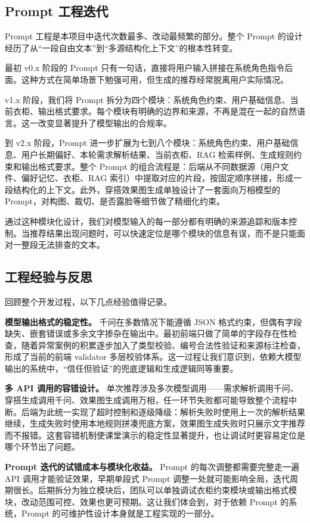 \documentclass{applemlr}
\begin{document}
\subsection{Prompt 工程迭代}

Prompt 工程是本项目中迭代次数最多、改动最频繁的部分。整个 Prompt 的设计经历了从``一段自由文本''到``多源结构化上下文''的根本性转变。

最初 v0.x 阶段的 Prompt 只有一句话，直接将用户输入拼接在系统角色指令后面。这种方式在简单场景下勉强可用，但生成的推荐经常脱离用户实际情况。

v1.x 阶段，我们将 Prompt 拆分为四个模块：系统角色约束、用户基础信息、当前衣柜、输出格式要求。每个模块有明确的边界和来源，不再是混在一起的自然语言。这一改变显著提升了模型输出的合规率。

到 v2.x 阶段，Prompt 进一步扩展为七到八个模块：系统角色约束、用户基础信息、用户长期偏好、本轮需求解析结果、当前衣柜、RAG 检索样例、生成规则约束和输出格式要求。整个 Prompt 的组合流程是：后端从不同数据源（用户文件、偏好记忆、衣柜、RAG 索引）中提取对应的片段，按固定顺序拼接，形成一段结构化的上下文。此外，穿搭效果图生成单独设计了一套面向万相模型的 Prompt，对构图、裁切、是否露脸等细节做了精细化约束。

通过这种模块化设计，我们对模型输入的每一部分都有明确的来源追踪和版本控制。当推荐结果出现问题时，可以快速定位是哪个模块的信息有误，而不是只能面对一整段无法排查的文本。

\subsection{工程经验与反思}

回顾整个开发过程，以下几点经验值得记录。

\textbf{模型输出格式的稳定性。} 千问在多数情况下能遵循 JSON 格式约束，但偶有字段缺失、嵌套错误或多余文字掺杂在输出中。最初前端只做了简单的字段存在性检查，随着异常案例的积累逐步加入了类型校验、编号合法性验证和来源标注检查，形成了当前的前端 validator 多层校验体系。这一过程让我们意识到，依赖大模型输出的系统中，``信任但验证''的兜底逻辑和生成逻辑同等重要。

\textbf{多 API 调用的容错设计。} 单次推荐涉及多次模型调用——需求解析调用千问、穿搭生成调用千问、效果图生成调用万相，任一环节失败都可能导致整个流程中断。后端为此统一实现了超时控制和逐级降级：解析失败时使用上一次的解析结果继续，生成失败时使用本地规则拼凑兜底方案，效果图生成失败时只展示文字推荐而不报错。这套容错机制使课堂演示的稳定性显著提升，也让调试时更容易定位是哪个环节出了问题。

\textbf{Prompt 迭代的试错成本与模块化收益。} Prompt 的每次调整都需要完整走一遍 API 调用才能验证效果，早期单段式 Prompt 调整一处就可能影响全局，迭代周期很长。后期拆分为独立模块后，团队可以单独调试衣柜约束模块或输出格式模块，改动范围可控、效果也更可预期。这让我们体会到，对于依赖 Prompt 的系统，Prompt 的可维护性设计本身就是工程实现的一部分。
\end{document}
